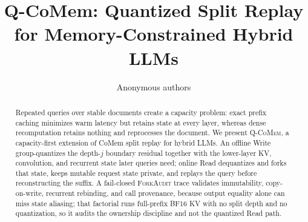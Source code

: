 \documentclass{article}
\title{Q-CoMem: Quantized Split Replay for Memory-Constrained Hybrid LLMs}
\author{Anonymous authors}
\newcommand{\qcomem}{\textsc{Q-CoMem}}
\newcommand{\method}{\textsc{ForkAudit}}
\begin{document}
\raggedbottom
\maketitle

\begin{abstract}
Repeated queries over stable documents create a capacity problem: exact prefix
caching minimizes warm latency but retains state at every layer, whereas dense
recomputation retains nothing and reprocesses the document.  We present
\qcomem{}, a capacity-first extension of CoMem split replay for hybrid LLMs.  An
offline Write group-quantizes the depth-$j$ boundary residual together with the
lower-layer KV, convolution, and recurrent state later queries need; online Read
dequantizes and forks that state, keeps mutable request state private, and
replays the query before reconstructing the suffix.  A fail-closed \method{}
trace validates immutability, copy-on-write, recurrent rebinding, and call
provenance, because output equality alone can miss state aliasing; that
factorial runs full-prefix BF16 KV with no split depth and no quantization, so
it audits the ownership discipline and not the quantized Read path.


\end{abstract}
\end{document}
